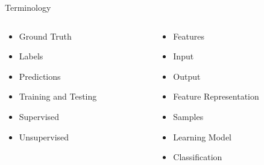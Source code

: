 \documentclass[aspectratio=169, 14pt,usenames,dvipsnames]{beamer}
\begin{document}
\begin{frame}{Terminology}
	\begin{columns}
		\begin{column}{0.5\textwidth}
			\begin{itemize}
				\item Ground Truth
				\item Labels
				\item Predictions
				\item Training and Testing
				\item Supervised
				\item Unsupervised
			\end{itemize}
		\end{column}
		\begin{column}{0.5\textwidth}
			\begin{itemize}
				\item Features
				\item Input
				\item Output
				\item Feature Representation
				\item Samples
				\item Learning Model
				\item Classification
			\end{itemize}
		\end{column}
	\end{columns}
\end{frame}
\end{document}
